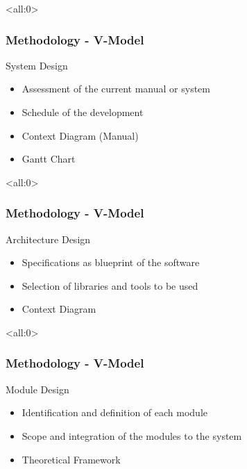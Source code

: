 \documentclass{beamer}
\begin{document}
\begin{frame}<all:0>
	\frametitle{Methodology - V-Model}
	\begin{block}{System Design}
		\begin{itemize}
			\item<1-> Assessment of the current manual or system
			\item<2-> Schedule of the development
		\end{itemize}

		\begin{itemize}
			\item<3-> Context Diagram (Manual)
			\item<4-> Gantt Chart
		\end{itemize}
	\end{block}
\end{frame}

\begin{frame}<all:0>
	\frametitle{Methodology - V-Model}
	\begin{block}{Architecture Design}
		\begin{itemize}
			\item<1-> Specifications as blueprint of the software
			\item<2-> Selection of libraries and tools to be used
		\end{itemize}

		\begin{itemize}
			\item<3-> Context Diagram
		\end{itemize}
	\end{block}
\end{frame}

\begin{frame}<all:0>
	\frametitle{Methodology - V-Model}
	\begin{block}{Module Design}
		\begin{itemize}
			\item<1-> Identification and definition of each module
			\item<2-> Scope and integration of the modules to the system
		\end{itemize}

		\begin{itemize}
			\item<3-> Theoretical Framework
		\end{itemize}
	\end{block}
\end{frame}
\end{document}
